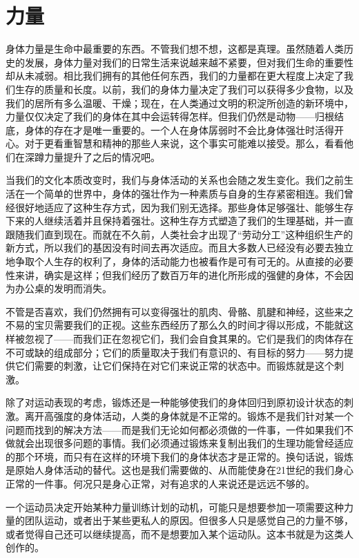 \chapter{力量}

身体力量是生命中最重要的东西。不管我们想不想，这都是真理。虽然随着人类历史的发展，身体力量对我们的日常生活来说越来越不紧要，但对我们生命的重要性却从未减弱。相比我们拥有的其他任何东西，我们的力量都在更大程度上决定了我们生存的质量和长度。以前，我们的身体力量决定了我们可以获得多少食物，以及我们的居所有多么温暖、干燥；现在，在人类通过文明的积淀所创造的新环境中，力量仅仅决定了我们的身体在其中会运转得怎样。但我们仍然是动物——归根结底，身体的存在才是唯一重要的。一个人在身体孱弱时不会比身体强壮时活得开心。对于更看重智慧和精神的那些人来说，这个事实可能难以接受。那么，看看他们在深蹲力量提升了之后的情况吧。

当我们的文化本质改变时，我们与身体活动的关系也会随之发生变化。我们之前生活在一个简单的世界中，身体的强壮作为一种素质与自身的生存紧密相连。我们曾经很好地适应了这种生存方式，因为我们别无选择。那些身体足够强壮、能够生存下来的人继续活着并且保持着强壮。这种生存方式塑造了我们的生理基础，并一直跟随我们直到现在。而就在不久前，人类社会才出现了“劳动分工”这种组织生产的新方式，所以我们的基因没有时间去再次适应。而且大多数人已经没有必要去独立地争取个人生存的权利了，身体的活动能力也被看作是可有可无的。从直接的必要性来讲，确实是这样；但我们经历了数百万年的进化所形成的强健的身体，不会因为办公桌的发明而消失。

不管是否喜欢，我们仍然拥有可以变得强壮的肌肉、骨骼、肌腱和神经，这些来之不易的宝贝需要我们的正视。这些东西经历了那么久的时间才得以形成，不能就这样被忽视了——而我们正在忽视它们，我们会自食其果的。它们是我们的肉体存在不可或缺的组成部分；它们的质量取决于我们有意识的、有目标的努力——努力提供它们需要的刺激，让它们保持在对它们来说正常的状态中。而锻炼就是这个刺激。

除了对运动表现的考虑，锻炼还是一种能够使我们的身体回归到原初设计状态的刺激。离开高强度的身体活动，人类的身体就是不正常的。锻炼不是我们针对某一个问题而找到的解决方法——而是我们无论如何都必须做的一件事，一件如果我们不做就会出现很多问题的事情。我们必须通过锻炼来复制出我们的生理功能曾经适应的那个环境，而只有在这样的环境下我们的身体状态才是正常的。换句话说，锻炼是原始人身体活动的替代。这也是我们需要做的、从而能使身在21世纪的我们身心正常的一件事。何况只是身心正常，对有追求的人来说还是远远不够的。

一个运动员决定开始某种力量训练计划的动机，可能只是想要参加一项需要这种力量的团队运动，或者出于某些更私人的原因。但很多人只是感觉自己的力量不够，或者觉得自己还可以继续提高，而不是想要加入某个运动队。这本书就是为这类人创作的。

